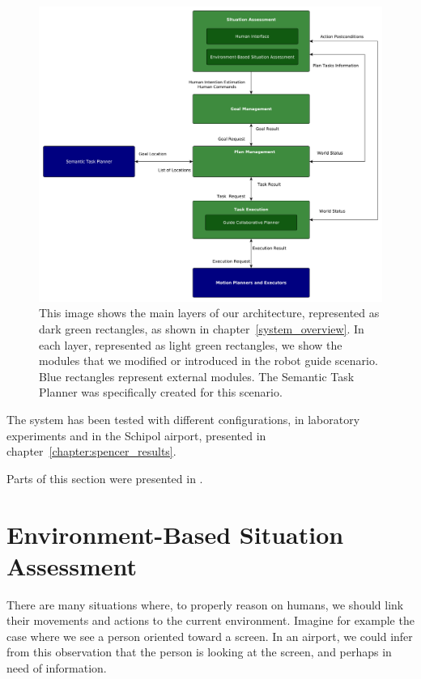 \begin{figure}[ht!]
	\centering
	\includegraphics[scale=0.38]{img/case_study/spencer/architecture.pdf}
	\caption[Robot guide architecture]{This image shows the main layers of our architecture, represented as dark green rectangles, as shown in chapter~\ref{system_overview}. In each layer, represented as light green rectangles, we show the modules that we modified or introduced in the robot guide scenario. Blue rectangles represent external modules. The Semantic Task Planner was specifically created for this scenario.}
	\label{fig:spencer-architecture}
\end{figure}

The system has been tested with different configurations, in laboratory experiments and in the Schipol airport, presented in chapter~\ref{chapter:spencer_results}. 

Parts of this section were presented in \cite{fiore2015adaptive}.

\section{Environment-Based Situation Assessment}
\label{sec:spencer-intention}
There are many situations where, to properly reason on humans, we should link their movements and actions to the current environment. Imagine for example the case where we see a person oriented toward a screen. In an airport, we could infer from this observation that the person is looking at the screen, and perhaps in need of information. 


